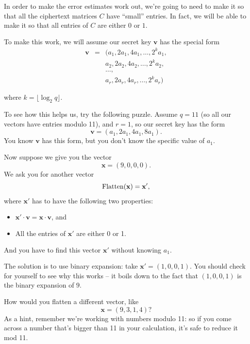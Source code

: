 In order to make the error estimates work out, we're going to need to
make it so that all the ciphertext matrices $C$ have ``small''
entries. In fact, we will be able to make it so that all entries of
$C$ are either $0$ or $1$.

To make this work, we will assume our secret key $\mathbf{v}$ has the
special form
\begin{eqnarray}
\mathbf{v} & = & (a_{1},2a_{1},4a_{1},\ldots,2^{k}a_{1}, \nonumber \\
& & a_{2},2a_{2},4a_{2},\ldots,2^{k}a_{2}, \nonumber \\
& & \ldots , \nonumber \\
& & a_{r},2a_{r},4a_{r},\ldots,2^{k}a_{r})
\label{fhe-v-form}
\end{eqnarray}

where $k = \lfloor\log_{2}q\rfloor$.

To see how this helps us, try the following puzzle. Assume $q = 11$
(so all our vectors have entries modulo 11), and $r = 1$, so our
secret key has the form
\[\mathbf{v} = ( a_{1},2a_{1},4a_{1},8a_{1} ).\] You know
$\mathbf{v}$ has this form, but you don't know the specific value of
$a_{1}$.

Now suppose we give you the vector \[\mathbf{x} = (9,0,0,0).\] We ask
you for another vector
\[\operatorname{Flatten}( \mathbf{x} ) = \mathbf{x}',\] where
$\mathbf{x}'$ has to have the following two properties:

\begin{itemize}
\item
  $\mathbf{x}' \cdot \mathbf{v} = \mathbf{x} \cdot \mathbf{v}$, and
\item
  All the entries of $\mathbf{x}'$ are either 0 or 1.
\end{itemize}

And you have to find this vector $\mathbf{x}'$ without knowing
$a_{1}$.

The solution is to use binary expansion: take
$\mathbf{x}' = (1,0,0,1)$. You should check for yourself to see why
this works -- it boils down to the fact that $(1,0,0,1)$ is the binary
expansion of $9$.

\begin{exercise}{}{}
How would you flatten a different vector, like
\[\mathbf{x} = (9,3,1,4)?\] As a hint, remember we're working with
numbers modulo 11: so if you come across a number that's bigger than 11
in your calculation, it's safe to reduce it mod 11.
\end{exercise}

